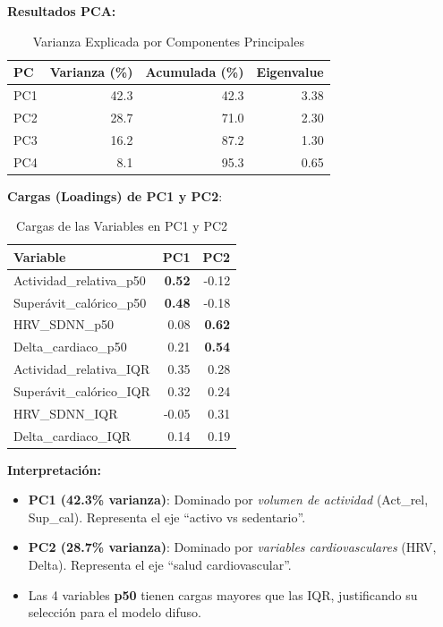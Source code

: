 \documentclass[12pt,letterpaper,twoside]{report}
\begin{document}
\begin{calculobox}
\textbf{Resultados PCA:}

\begin{table}[H]
\centering
\caption{Varianza Explicada por Componentes Principales}
\label{tab:pca_variance}
\begin{tabular}{@{}lrrr@{}}
\toprule
\textbf{PC} & \textbf{Varianza (\%)} & \textbf{Acumulada (\%)} & \textbf{Eigenvalue} \\
\midrule
PC1 & 42.3 & 42.3 & 3.38 \\
PC2 & 28.7 & 71.0 & 2.30 \\
PC3 & 16.2 & 87.2 & 1.30 \\
PC4 & 8.1  & 95.3 & 0.65 \\
\bottomrule
\end{tabular}
\end{table}

\textbf{Cargas (Loadings) de PC1 y PC2}:

\begin{table}[H]
\centering
\begin{tabular}{@{}lrr@{}}
\toprule
\textbf{Variable} & \textbf{PC1} & \textbf{PC2} \\
\midrule
Actividad\_relativa\_p50     & \textbf{0.52} & -0.12 \\
Superávit\_calórico\_p50     & \textbf{0.48} & -0.18 \\
HRV\_SDNN\_p50               & 0.08 & \textbf{0.62} \\
Delta\_cardiaco\_p50         & 0.21 & \textbf{0.54} \\
Actividad\_relativa\_IQR     & 0.35 & 0.28 \\
Superávit\_calórico\_IQR     & 0.32 & 0.24 \\
HRV\_SDNN\_IQR               & -0.05 & 0.31 \\
Delta\_cardiaco\_IQR         & 0.14 & 0.19 \\
\bottomrule
\end{tabular}
\caption{Cargas de las Variables en PC1 y PC2}
\label{tab:pca_loadings}
\end{table}
\end{calculobox}

\begin{decisionbox}
\textbf{Interpretación:}

\begin{itemize}[noitemsep]
    \item \textbf{PC1 (42.3\% varianza)}: Dominado por \textit{volumen de actividad} (Act\_rel, Sup\_cal). Representa el eje ``activo vs sedentario''.
    \item \textbf{PC2 (28.7\% varianza)}: Dominado por \textit{variables cardiovasculares} (HRV, Delta). Representa el eje ``salud cardiovascular''.
    \item Las 4 variables \textbf{p50} tienen cargas mayores que las IQR, justificando su selección para el modelo difuso.
\end{itemize}
\end{decisionbox}
\end{document}
